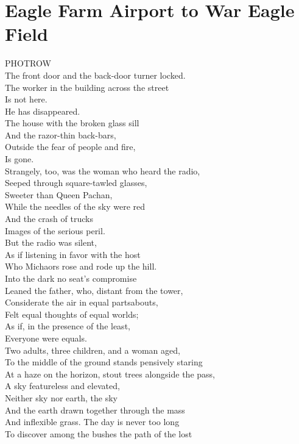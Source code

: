 \documentclass[smalldemyvopaper,11pt,twoside,onecolumn,openright,extrafontsizes]{memoir}
\begin{document}
\chapter{Eagle Farm Airport to War Eagle Field}
PHOTROW
\\The front door and the back-door turner locked.
\\The worker in the building across the street
\\Is not here.
\\He has disappeared.
\\The house with the broken glass sill
\\And the razor-thin back-bars,
\\Outside the fear of people and fire,
\\Is gone.
\\Strangely, too, was the woman who heard the radio,
\\Seeped through square-tawled glasses,
\\Sweeter than Queen Pachan,
\\While the needles of the sky were red
\\And the crash of trucks
\\Images of the serious peril.
\\But the radio was silent,
\\As if listening in favor with the host
\\Who Michaors rose and rode up the hill.
\\Into the dark no seat's compromise
\\Leaned the father, who, distant from the tower,
\\Considerate the air in equal partsabouts,
\\Felt equal thoughts of equal worlds;
\\As if, in the presence of the least,
\\Everyone were equals.
\\Two adults, three children, and a woman aged,
\\To the middle of the ground stands pensively staring
\\At a haze on the horizon, stout trees alongside the pass,
\\A sky featureless and elevated,
\\Neither sky nor earth, the sky
\\And the earth drawn together through the mass
\\And inflexible grass. The day is never too long
\\To discover among the bushes the path of the lost
\end{document}
